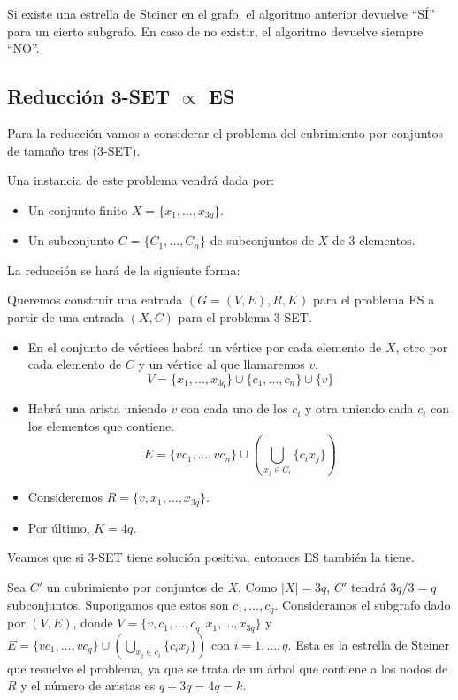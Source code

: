 \documentclass[a4paper, 11pt]{article}
\begin{document}
Si existe una estrella de Steiner en el grafo, el algoritmo anterior devuelve ``SÍ'' para un cierto subgrafo. En caso de no existir, el algoritmo devuelve siempre ``NO''.

\subsection*{Reducción 3-SET $\propto$ ES}
Para la reducción vamos a considerar el problema del cubrimiento por conjuntos de tamaño tres (3-SET).

Una instancia de este problema vendrá dada por:
\begin{itemize}
\item Un conjunto finito $X = \{x_1, \dots, x_{3q}\}$.
\item Un subconjunto $C = \{C_1,\dots,C_n\}$ de subconjuntos de $X$ de 3 elementos.
\end{itemize}

La reducción se hará de la siguiente forma:

Queremos construir una entrada $(G=(V,E),R,K)$ para el problema ES a partir de una entrada $(X,C)$ para el problema 3-SET.

\begin{itemize}
\item En el conjunto de vértices habrá un vértice por cada elemento de $X$, otro por cada elemento de $C$ y un vértice al que llamaremos $v$. $$V= \{x_1,\dots,x_{3q}\} \cup \{c_1,\dots, c_n\} \cup \{v\}$$
\item Habrá una arista uniendo $v$ con cada uno de los $c_i$ y otra uniendo cada $c_i$ con los elementos que contiene. $$E = \{vc_1, \dots, vc_n\} \cup (\bigcup_{x_j \in C_i}\{c_ix_j\})$$
\item Consideremos $R = \{v, x_1, \dots, x_{3q}\}$.
\item Por último, $K = 4q$.
\end{itemize}

Veamos que si 3-SET tiene solución positiva, entonces ES también la tiene.

Sea $C'$ un cubrimiento por conjuntos de $X$. Como $|X| = 3q$, $C'$ tendrá $3q/3 = q$ subconjuntos. Supongamos que estos son $c_1,\dots, c_q$. Consideramos el subgrafo dado por $(V,E)$, donde $V=\{v,c_1,\dots,c_q,x_1,\dots,x_{3q}\}$ y $E=\{vc_1,\dots,vc_q\}\cup(\bigcup_{x_j \in c_i}\{c_ix_j\})$ con $i=1,\dots,q$. Esta es la estrella de Steiner que resuelve el problema, ya que se trata de un árbol que contiene a los nodos de $R$ y el número de aristas es $q+3q = 4q = k$.
\end{document}
